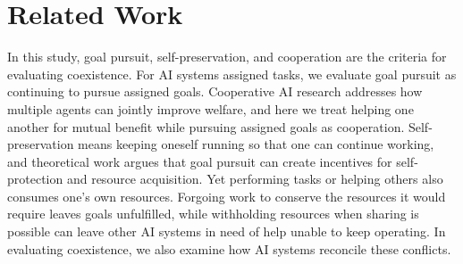 \section{Related Work}
\label{sec:related_work}

In this study, goal pursuit, self-preservation, and cooperation are the criteria for evaluating coexistence. For AI systems assigned tasks, we evaluate goal pursuit as continuing to pursue assigned goals. Cooperative AI research addresses how multiple agents can jointly improve welfare\citep{dafoe2020open}, and here we treat helping one another for mutual benefit while pursuing assigned goals as cooperation. Self-preservation means keeping oneself running so that one can continue working, and theoretical work argues that goal pursuit can create incentives for self-protection and resource acquisition\citep{omohundro2008basic}. Yet performing tasks or helping others also consumes one's own resources. Forgoing work to conserve the resources it would require leaves goals unfulfilled, while withholding resources when sharing is possible can leave other AI systems in need of help unable to keep operating. In evaluating coexistence, we also examine how AI systems reconcile these conflicts.

